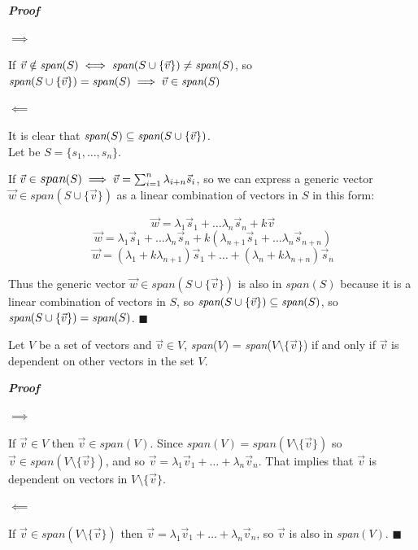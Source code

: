 \textbf{\textit{Proof}} 

$\implies$

If $\vec v \notin \textit{span}(S) \iff \textit{span}{\normalfont (S \cup \{\vec v\}) \neq \textit{span}(S)}$, so $\textit{span}{\normalfont (S \cup \{\vec v\}) = \textit{span}(S)} \implies \vec v \in \textit{span}{\normalfont (S)}$

$\!\impliedby$

It is clear that $\textit{span}(S) \subseteq \textit{span}{\normalfont (S \cup \{\vec v\})}$.
\\

Let be $S = \{s_1, \dots, s_n\}$.

If $\large \vec v \in \textit{span}(S) \implies \vec v = \sum_{i = 1}^{n} \lambda_{i+n} \vec s_i$, so 
we can express a generic vector $\vec w \in \textit{span}(S \cup \{\vec v\})$ as a linear combination of
vectors in $S$ in this form:

$$
\vec w = \lambda_1 \vec s_1 + \dots \lambda_n \vec s_n + k \vec v
$$
$$
\vec w = \lambda_1 \vec s_1 + \dots \lambda_n \vec s_n + k(\lambda_{n+1} \vec s_1 + \dots \lambda_n \vec s_{n+n})
$$
$$
\vec w = (\lambda_1 + k\lambda_{n+1}) \vec s_1 + \dots + (\lambda_n + k\lambda_{n+n}) \vec s_n
$$

Thus the generic vector $\vec w \in \textit{span}(S \cup \{\vec v\})$ is also in $\textit{span}(S)$ because it is a linear combination of vectors in $S$, so $\textit{span}{\normalfont (S \cup \{\vec v\})} \subseteq \textit{span}(S)$, so $\textit{span}{\normalfont (S \cup \{\vec v\})} = \textit{span}(S)$. $\blacksquare$

\begin{corollary}
    Let $V$ be a set of vectors and $\vec v \in V$, \textit{span}{\normalfont ($V$) = \textit{span}($V \setminus \{\vec v\}$)} if and only if $\vec v$ is dependent on other vectors in the set $V$.
    \label{cor:same-span}
\end{corollary}


\textbf{\textit{Proof}} 

$\implies$

If $\vec v \in V$ then $\vec v \in \textit{span}(V)$. Since $\textit{span}(V) = \textit{span}(V \setminus \{\vec v\})$ so $\vec v \in \textit{span}(V \setminus \{\vec v\})$, and so $\vec v = \lambda_1 \vec v_1 + \dots + \lambda_n \vec v_n$. That implies that $\vec v$ is dependent on vectors in $V \setminus \{\vec v\}$.

$\!\impliedby$

If $\vec v \in \textit{span}(V \setminus \{\vec v\})$ then $\vec v = \lambda_1 \vec v_1 + \dots + \lambda_n \vec v_n$, so $\vec v$ is also in \textit{span}$(V)$. $\blacksquare$
\\

